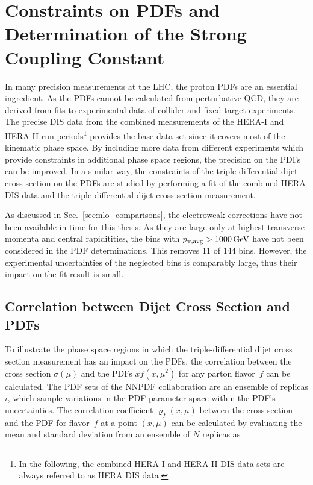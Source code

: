 
\chapter{Constraints on PDFs and Determination of the Strong Coupling Constant}
\label{sec:pdf_constraints}

In many precision measurements at the LHC, the proton PDFs are an essential
ingredient. As the PDFs cannot be calculated from perturbative QCD, they are
derived from fits to experimental data of collider and fixed-target experiments.
The precise DIS data from the combined measurements of the HERA-I and HERA-II
run periods\footnote{In the following, the combined HERA-I and HERA-II DIS data sets
are always referred to as HERA DIS data.} provides the base data set since it
covers most of the kinematic phase space. By including more data from different
experiments which provide constraints in additional phase space regions, the
precision on the PDFs can be improved. In a similar way, the constraints of the
triple-differential dijet cross section on the PDFs are studied by performing a
fit of the combined HERA DIS data and the triple-differential dijet cross
section measurement.

As discussed in Sec.~\ref{sec:nlo_comparisons}, the electroweak corrections have
not been available in time for this thesis. As they are large only at highest
transverse momenta and central rapiditities, the bins with $\ptavg >
\SI{1000}{\GeV}$ have not been considered in the PDF determinations. This
removes 11 of 144 bins. However, the experimental uncertainties of the neglected
bins is comparably large, thus their impact on the fit result is small.

\section{Correlation between Dijet Cross Section and PDFs}
\label{sec:pdf_sensitivity}

To illustrate the phase space regions in which the triple-differential dijet
cross section measurement has an impact on the PDFs, the correlation between the cross
section $\sigma(\mu)$ and the PDFs $xf(x,\mu^2)$ for any parton flavor~$f$ can be
calculated. The PDF sets of the NNPDF collaboration are an ensemble of replicas
$i$, which sample variations in the PDF parameter space within the PDF's
uncertainties. The correlation coefficient $\varrho_f(x,\mu)$ between the cross
section and the PDF for flavor~$f$ at a point $(x,\mu)$ can be calculated by
evaluating the mean and standard deviation from an ensemble of $N$ replicas as

